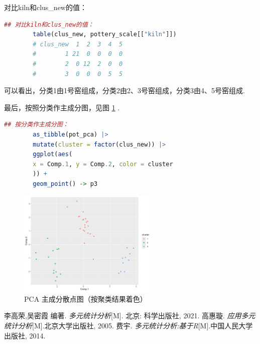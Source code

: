 \documentclass[12pt, a4paper, oneside]{ctexart}
\begin{document}
	对比kiln和clus\_new的值：
	\begin{lstlisting}[language=R]
		## 对比kiln和clus_new的值：
		table(clus_new, pottery_scale[["kiln"]])
		# clus_new  1  2  3  4  5
		#        1 21  0  0  0  0
		#        2  0 12  2  0  0
		#        3  0  0  0  5  5
	\end{lstlisting}
	
	可以看出，分类1由1号窑组成，分类2由2、3号窑组成，分类3由4、5号窑组成.
	
	最后，按照分类作主成分图，见图 \ref{fig:PCA_cluster} .
	\begin{lstlisting}[language=R]
		## 按分类作主成分图：
		as_tibble(pot_pca) |>
		mutate(cluster = factor(clus_new)) |>
		ggplot(aes(
		x = Comp.1, y = Comp.2, color = cluster
		)) +
		geom_point() -> p3
	\end{lstlisting}
	\begin{figure}[H]
		\centering
		\includegraphics[width=0.6\textwidth]{../Figure/PCA_by_cluster.png}
		\caption{PCA 主成分散点图（按聚类结果着色）}
		\label{fig:PCA_cluster}
	\end{figure}
	\newpage
	
	\begin{thebibliography}{99}
		李高荣,吴密霞 编著. \emph{多元统计分析}[M]. 北京: 科学出版社, 2021.
		高惠璇. \emph{应用多元统计分析}[M].北京大学出版社, 2005.
		费宇. \emph{多元统计分析:基于R}[M].中国人民大学出版社, 2014.
	\end{thebibliography}
	
	\newpage
	
\end{document}
